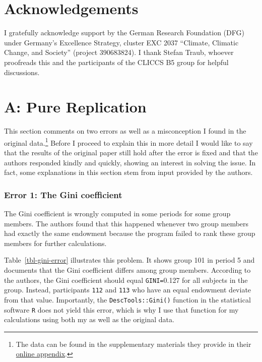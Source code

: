 \documentclass[
  authoryear,
  review,
  3p,
  onecolumn]{elsarticle}
\begin{document}
\hypertarget{acknowledgements}{%
\section{Acknowledgements}\label{acknowledgements}}

I gratefully acknowledge support by the German Research Foundation (DFG)
under Germany's Excellence Strategy, cluster EXC 2037 ``Climate,
Climatic Change, and Society'' (project 390683824). I thank Stefan
Traub, whoever proofreads this and the participants of the CLICCS B5
group for helpful discussions.

\newpage{}

\hypertarget{a-pure-replication}{%
\section{A: Pure Replication}\label{a-pure-replication}}

This section comments on two errors as well as a misconception I found
in the original data.\footnote{The data can be found in the
  supplementary materials they provide in their
  \href{https://www.sciencedirect.com/science/article/pii/S0047272717300361\#s0115}{online
  appendix}.} Before I proceed to explain this in more detail I would
like to say that the results of the original paper still hold after the
error is fixed and that the authors responded kindly and quickly,
showing an interest in solving the issue. In fact, some explanations in
this section stem from input provided by the authors.

\hypertarget{error-1-the-gini-coefficient}{%
\subsubsection{Error 1: The Gini
coefficient}\label{error-1-the-gini-coefficient}}

The Gini coefficient is wrongly computed in some periods for some group
members. The authors found that this happened whenever two group members
had exactly the same endowment because the program failed to rank these
group members for further calculations.

Table~\ref{tbl-gini-error} illustrates this problem. It shows group 101
in period 5 and documents that the Gini coefficient differs among group
members. According to the authors, the Gini coefficient should equal
\texttt{GINI=}0.127 for all subjects in the group. Instead, participants
\texttt{112} and \texttt{113} who have an equal endowment deviate from
that value. Importantly, the \texttt{DescTools::Gini()} function in the
statistical software \texttt{R} does not yield this error, which is why
I use that function for my calculations using both my as well as the
original data.
\end{document}
